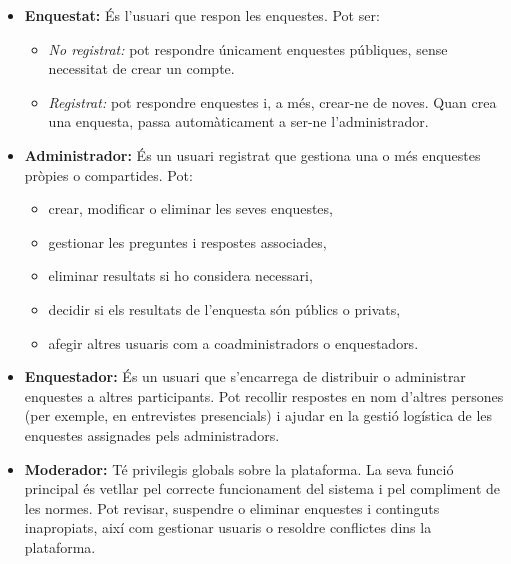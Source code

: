 \documentclass[../main.tex]{subfiles}
\begin{document}
\begin{itemize}
    \item \textbf{Enquestat:}  
    És l’usuari que respon les enquestes.  
    Pot ser:
    \begin{itemize}
        \item \textit{No registrat:} pot respondre únicament enquestes públiques, sense necessitat de crear un compte.
        \item \textit{Registrat:} pot respondre enquestes i, a més, crear-ne de noves.  
        Quan crea una enquesta, passa automàticament a ser-ne l’administrador.
    \end{itemize}

    \item \textbf{Administrador:}  
    És un usuari registrat que gestiona una o més enquestes pròpies o compartides.  
    Pot:
    \begin{itemize}
        \item crear, modificar o eliminar les seves enquestes,
        \item gestionar les preguntes i respostes associades,
        \item eliminar resultats si ho considera necessari,
        \item decidir si els resultats de l’enquesta són públics o privats,
        \item afegir altres usuaris com a coadministradors o enquestadors.
    \end{itemize}

    \item \textbf{Enquestador:}  
    És un usuari que s’encarrega de distribuir o administrar enquestes a altres participants.  
    Pot recollir respostes en nom d’altres persones (per exemple, en entrevistes presencials) 
    i ajudar en la gestió logística de les enquestes assignades pels administradors.

    \item \textbf{Moderador:}  
    Té privilegis globals sobre la plataforma.  
    La seva funció principal és vetllar pel correcte funcionament del sistema i pel compliment de les normes.  
    Pot revisar, suspendre o eliminar enquestes i continguts inapropiats, 
    així com gestionar usuaris o resoldre conflictes dins la plataforma.
\end{itemize}
\end{document}
